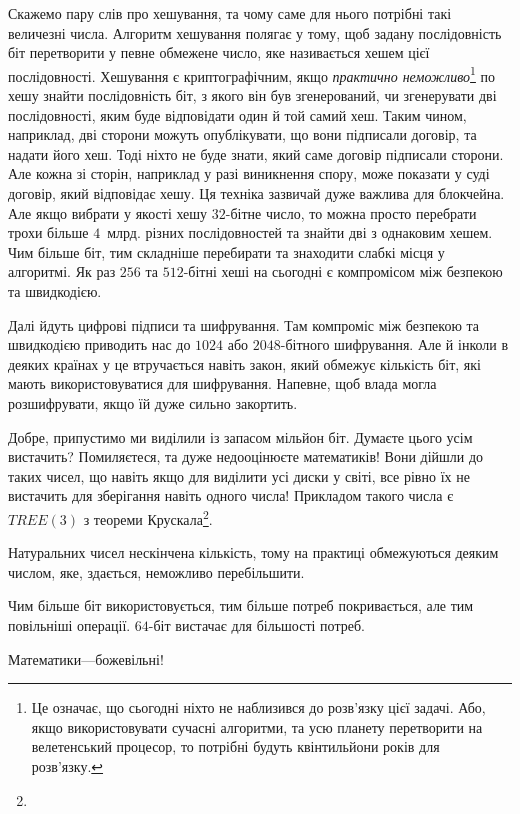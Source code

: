 Скажемо пару слів про хешування, та чому саме для нього потрібні такі величезні числа.
Алгоритм хешування полягає у тому, щоб задану послідовність біт перетворити у певне обмежене число, яке називається хешем цієї послідовності.
Хешування є криптографічним, якщо \textit{практично неможливо}\footnote{
  Це означає, що сьогодні ніхто не наблизився до розв'язку цієї задачі.
  Або, якщо використовувати сучасні алгоритми, та усю планету перетворити на велетенський процесор, то потрібні будуть квінтильйони років для розв'язку.
} по хешу знайти послідовність біт, з якого він був згенерований, чи згенерувати дві послідовності, яким буде відповідати один й той самий хеш.
Таким чином, наприклад, дві сторони можуть опублікувати, що вони підписали договір, та надати його хеш.
Тоді ніхто не буде знати, який саме договір підписали сторони.
Але кожна зі сторін, наприклад у разі виникнення спору, може показати у суді договір, який відповідає хешу.
Ця техніка зазвичай дуже важлива для блокчейна.
Але якщо вибрати у якості хешу $32$-бітне число, то можна просто перебрати трохи більше $4$~млрд. різних послідовностей та знайти дві з однаковим хешем.
Чим більше біт, тим складніше перебирати та знаходити слабкі місця у алгоритмі.
Як раз $256$ та $512$-бітні хеші на сьогодні є компромісом між безпекою та швидкодією.

Далі йдуть цифрові підписи та шифрування.
Там компроміс між безпекою та швидкодією приводить нас до $1024$ або $2048$-бітного шифрування.
Але й інколи в деяких країнах у це втручається навіть закон, який обмежує кількість біт, які мають використовуватися для шифрування.
Напевне, щоб влада могла розшифрувати, якщо їй дуже сильно закортить.

Добре, припустимо ми виділили із запасом мільйон біт.
Думаєте цього усім вистачить?
Помиляєтеся, та дуже недооцінюєте математиків!
Вони дійшли до таких чисел, що навіть якщо для виділити усі диски у світі, все рівно їх не вистачить для зберігання навіть одного числа!
Прикладом такого числа є $TREE(3)$ з теореми Крускала\footnote{\kruskalref}.

\begin{summary}
\item Натуральних чисел нескінчена кількість, тому на практиці обмежуються деяким числом, яке, здається, неможливо перебільшити.
\item Чим більше біт використовується, тим більше потреб покривається, але тим повільніші операції. $64$-біт вистачає для більшості потреб.
\item Математики---божевільні!
\end{summary}


